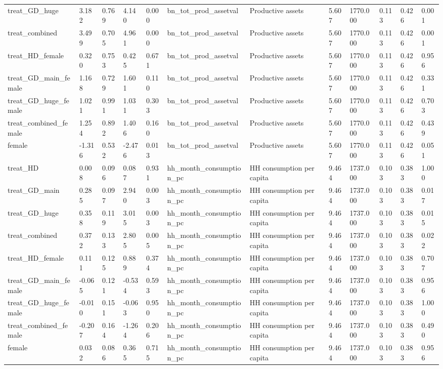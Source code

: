 \begin{tabular}{llllllllllll}
treat\_GD\_huge & 3.182 & 0.769 & 4.140 & 0.000 & bn\_tot\_prod\_assetval & Productive assets & 5.607 & 1770.000 & 0.113 & 0.426 & 0.001 \\
treat\_combined & 3.499 & 0.705 & 4.961 & 0.000 & bn\_tot\_prod\_assetval & Productive assets & 5.607 & 1770.000 & 0.113 & 0.426 & 0.001 \\
treat\_HD\_female & 0.320 & 0.753 & 0.425 & 0.671 & bn\_tot\_prod\_assetval & Productive assets & 5.607 & 1770.000 & 0.113 & 0.426 & 0.956 \\
treat\_GD\_main\_female & 1.168 & 0.729 & 1.601 & 0.110 & bn\_tot\_prod\_assetval & Productive assets & 5.607 & 1770.000 & 0.113 & 0.426 & 0.331 \\
treat\_GD\_huge\_female & 1.021 & 0.991 & 1.031 & 0.303 & bn\_tot\_prod\_assetval & Productive assets & 5.607 & 1770.000 & 0.113 & 0.426 & 0.703 \\
treat\_combined\_female & 1.254 & 0.892 & 1.406 & 0.160 & bn\_tot\_prod\_assetval & Productive assets & 5.607 & 1770.000 & 0.113 & 0.426 & 0.439 \\
female & -1.316 & 0.532 & -2.476 & 0.013 & bn\_tot\_prod\_assetval & Productive assets & 5.607 & 1770.000 & 0.113 & 0.426 & 0.051 \\
treat\_HD & 0.008 & 0.096 & 0.087 & 0.931 & hh\_month\_consumption\_pc & HH consumption per capita & 9.464 & 1737.000 & 0.103 & 0.383 & 1.000 \\
treat\_GD\_main & 0.285 & 0.097 & 2.940 & 0.003 & hh\_month\_consumption\_pc & HH consumption per capita & 9.464 & 1737.000 & 0.103 & 0.383 & 0.017 \\
treat\_GD\_huge & 0.358 & 0.119 & 3.015 & 0.003 & hh\_month\_consumption\_pc & HH consumption per capita & 9.464 & 1737.000 & 0.103 & 0.383 & 0.015 \\
treat\_combined & 0.372 & 0.133 & 2.805 & 0.005 & hh\_month\_consumption\_pc & HH consumption per capita & 9.464 & 1737.000 & 0.103 & 0.383 & 0.022 \\
treat\_HD\_female & 0.111 & 0.125 & 0.889 & 0.374 & hh\_month\_consumption\_pc & HH consumption per capita & 9.464 & 1737.000 & 0.103 & 0.383 & 0.707 \\
treat\_GD\_main\_female & -0.065 & 0.121 & -0.534 & 0.593 & hh\_month\_consumption\_pc & HH consumption per capita & 9.464 & 1737.000 & 0.103 & 0.383 & 0.956 \\
treat\_GD\_huge\_female & -0.010 & 0.151 & -0.063 & 0.950 & hh\_month\_consumption\_pc & HH consumption per capita & 9.464 & 1737.000 & 0.103 & 0.383 & 1.000 \\
treat\_combined\_female & -0.207 & 0.164 & -1.264 & 0.206 & hh\_month\_consumption\_pc & HH consumption per capita & 9.464 & 1737.000 & 0.103 & 0.383 & 0.490 \\
female & 0.032 & 0.086 & 0.365 & 0.715 & hh\_month\_consumption\_pc & HH consumption per capita & 9.464 & 1737.000 & 0.103 & 0.383 & 0.956 \\
\bottomrule
\end{tabular}
